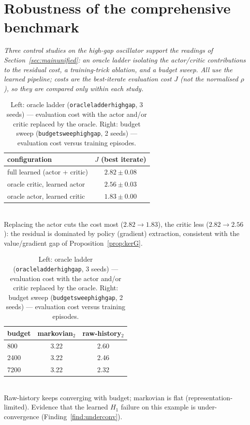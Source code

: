 \documentclass[11pt]{article}
\renewcommand{\_}{\discretionary{\textunderscore}{}{\textunderscore}}
\theoremstyle{plain}
\theoremstyle{definition}
\begin{document}
\section{Robustness of the comprehensive benchmark}\label{app:robust}

\emph{Three control studies on the high-gap oscillator support the readings of
Section~\ref{sec:mainunified}: an oracle ladder isolating the actor/critic contributions to the
residual cost, a training-trick ablation, and a budget sweep. All use the learned pipeline; costs
are the best-iterate evaluation cost $J$ (not the normalised $\rho$), so they are compared only
within each study.}

\begin{table}[ht]\centering\small
\caption{Left: oracle ladder (\texttt{oracle\_ladder\_high\_gap}, 3 seeds) --- evaluation cost
with the actor and/or critic replaced by the oracle. Right: budget sweep
(\texttt{budget\_sweep\_high\_gap}, 2 seeds) --- evaluation cost versus training episodes.}
\label{tab:robust}
\setlength{\tabcolsep}{6pt}
\begin{minipage}[t]{0.52\textwidth}\centering
\begin{tabular}{lc}
\toprule
configuration & $J$ (best iterate)\\
\midrule
full learned (actor + critic)  & $2.82\pm0.08$\\
oracle critic, learned actor   & $2.56\pm0.03$\\
oracle actor, learned critic   & $1.83\pm0.00$\\
\bottomrule
\end{tabular}\\[2pt]
{\footnotesize Replacing the actor cuts the cost most ($2.82\to1.83$), the critic less
($2.82\to2.56$): the residual is dominated by policy (gradient) extraction, consistent with the
value/gradient gap of Proposition~\ref{prop:kerG}.}
\end{minipage}\hfill
\begin{minipage}[t]{0.44\textwidth}\centering
\begin{tabular}{lcc}
\toprule
budget & markovian$_2$ & raw-history$_2$\\
\midrule
800   & 3.22 & 2.60\\
2400  & 3.22 & 2.46\\
7200  & 3.22 & 2.32\\
\bottomrule
\end{tabular}\\[2pt]
{\footnotesize Raw-history keeps converging with budget; markovian is flat
(representation-limited). Evidence that the learned $H_1$ failure on this example is
under-convergence (Finding~\ref{find:underconv}).}
\end{minipage}
\end{table}
\end{document}
